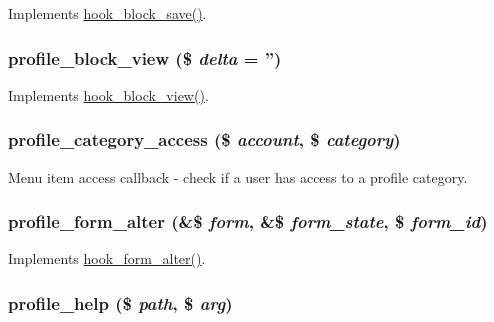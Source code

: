 \label{profile_8module_a245127a283b4afa8b603d759048aaf85}
Implements \hyperlink{group__hooks_ga622024ce4f818c241ca7a765e829f928}{hook\_\-block\_\-save()}. \hypertarget{profile_8module_a6cffc3b1748880b1606c5743d9746579}{
\subsubsection[{profile\_\-block\_\-view}]{\setlength{\rightskip}{0pt plus 5cm}profile\_\-block\_\-view (\$ {\em delta} = {\ttfamily ''})}}
\label{profile_8module_a6cffc3b1748880b1606c5743d9746579}
Implements \hyperlink{group__hooks_gaa14092a3e74cdc57aa295100cfd6860d}{hook\_\-block\_\-view()}. \hypertarget{profile_8module_abfe11b7a856c5a19d8e11044609cfdbf}{
\subsubsection[{profile\_\-category\_\-access}]{\setlength{\rightskip}{0pt plus 5cm}profile\_\-category\_\-access (\$ {\em account}, \/  \$ {\em category})}}
\label{profile_8module_abfe11b7a856c5a19d8e11044609cfdbf}
Menu item access callback -\/ check if a user has access to a profile category. \hypertarget{profile_8module_a1797a78888154f866995232f20ece3e5}{
\subsubsection[{profile\_\-form\_\-alter}]{\setlength{\rightskip}{0pt plus 5cm}profile\_\-form\_\-alter (\&\$ {\em form}, \/  \&\$ {\em form\_\-state}, \/  \$ {\em form\_\-id})}}
\label{profile_8module_a1797a78888154f866995232f20ece3e5}
Implements \hyperlink{group__hooks_ga6df3cea27ae1407aeef4eae5444cb213}{hook\_\-form\_\-alter()}. \hypertarget{profile_8module_a4c94451892aa2b5dd6b36c8a3f9fbe5a}{
\subsubsection[{profile\_\-help}]{\setlength{\rightskip}{0pt plus 5cm}profile\_\-help (\$ {\em path}, \/  \$ {\em arg})}}
